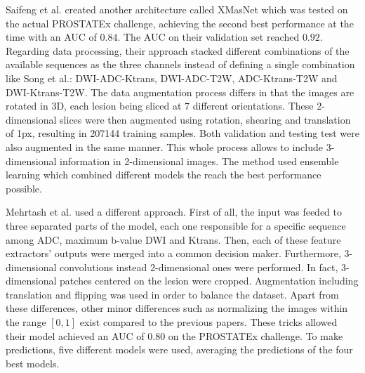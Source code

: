 Saifeng et al. \cite{31} created another architecture called XMasNet which was tested on the actual PROSTATEx challenge, achieving the second best performance at the time with an AUC of $0.84$. The AUC on their validation set reached $0.92$. Regarding data processing, their approach stacked different combinations of the available sequences as the three channels instead of defining a single combination like Song et al.: DWI-ADC-Ktrans, DWI-ADC-T2W, ADC-Ktrans-T2W and DWI-Ktrans-T2W. The data augmentation process differs in that the images are rotated in 3D, each lesion being sliced at 7 different orientations. These 2-dimensional slices were then augmented using rotation, shearing and translation of 1px, resulting in 207144 training samples. Both validation and testing test were also augmented in the same manner. This whole process allows to include 3-dimensional information in 2-dimensional images. The method used ensemble learning which combined different models the reach the best performance possible. 

Mehrtash et al. \cite{01} used a different approach. First of all, the input was feeded to three separated parts of the model, each one responsible for a specific sequence among ADC, maximum b-value DWI and Ktrans. Then, each of these feature extractors' outputs were merged into a common decision maker. Furthermore, 3-dimensional convolutions instead 2-dimensional ones were performed. In fact, 3-dimensional patches centered on the lesion were cropped. Augmentation including translation and flipping was used in order to balance the dataset. Apart from these differences, other minor differences such as normalizing the images within the range $[0,1]$ exist compared to the previous papers. These tricks allowed their model achieved an AUC of $0.80$ on the PROSTATEx challenge. To make predictions, five different models were used, averaging the predictions of the four best models. 

